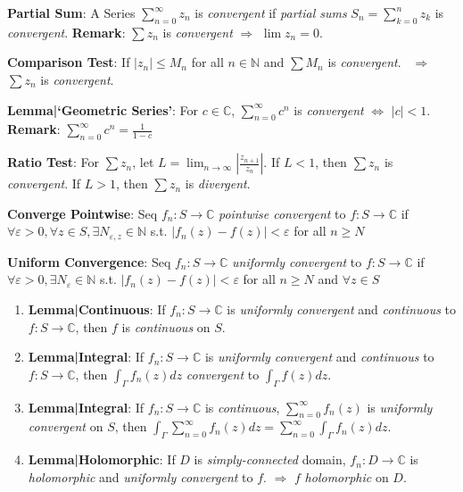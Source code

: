 \documentclass[9pt]{article}
\begin{document}
\textbf{Partial Sum}: A Series $\sum_{n=0}^{\infty}z_n$ is \textit{convergent} if \textit{partial sums} $S_n = \sum_{k=0}^{n}z_k$ is \textit{convergent}. \quad \textbf{Remark}: $\sum z_n$ is \textit{convergent} $\Rightarrow$ $\lim z_n=0$.

\textbf{Comparison Test}: If $|z_n|\leq M_n$ for all $n\in\mathbb{N}$ and $\sum M_n$ is \textit{convergent}. \ $\Rightarrow$ \ $\sum z_n$ is \textit{convergent}.

\textbf{Lemma|`Geometric Series'}: For $c\in\mathbb{C}$, $\sum_{n=0}^\infty c^n$ is \textit{convergent} $\Leftrightarrow$ $|c|<1$. \quad \textbf{Remark}: $\sum_{n=0}^\infty c^n=\frac{1}{1-c}$

\textbf{Ratio Test}: {\small For $\sum z_n$, let $L = \lim_{n\to\infty}\left|\frac{z_{n+1}}{z_n}\right|$. \quad If $L<1$, then $\sum z_n$ is \textit{convergent}. \quad If $L>1$, then $\sum z_n$ is \textit{divergent}.} 

\textbf{Converge Pointwise}: {\small Seq $f_n: S\to\mathbb{C}$ \textit{pointwise convergent} to $f:S\to\mathbb{C}$ if \quad $\forall \varepsilon>0, \forall z \in S, \exists N_{\varepsilon,z}\in\mathbb{N}$ s.t. $|f_n(z)-f(z)|<\varepsilon$ for all $n\geq N$}

\textbf{Uniform Convergence}: {\small Seq $f_n: S\to\mathbb{C}$ \textit{uniformly convergent} to $f:S\to\mathbb{C}$ if \quad $\forall \varepsilon>0, \exists N_{\varepsilon}\in\mathbb{N}$ s.t. $|f_n(z)-f(z)|<\varepsilon$ for all $n\geq N$ and $\forall z\in S$}

\begin{enumerate}[itemsep=-2pt, topsep=-2pt]
    \item \textbf{Lemma|Continuous}: If $f_n:S\to\mathbb{C}$ is \textit{uniformly convergent} and \textit{continuous} to $f:S\to\mathbb{C}$, then $f$ is \textit{continuous} on $S$.
    \item \textbf{Lemma|Integral}: If $f_n:S\to\mathbb{C}$ is \textit{uniformly convergent} and \textit{continuous} to $f:S\to\mathbb{C}$, then $\int_{\Gamma}f_n(z)dz$ \textit{convergent} to $\int_{\Gamma}f(z)dz$.
    \item \textbf{Lemma|Integral}: If $f_n:S\to\mathbb{C}$ is \textit{continuous}, $\sum^\infty_{n=0}f_n(z)$ is \textit{uniformly convergent} on $S$, then $\int_{\Gamma}\sum^\infty_{n=0}f_n(z)dz=\sum^\infty_{n=0}\int_{\Gamma}f_n(z)dz$.
    \item \textbf{Lemma|Holomorphic}: {\small If $D$ is \textit{simply-connected} domain, $f_n:D\to\mathbb{C}$ is \textit{holomorphic} and \textit{uniformly convergent} to $f$. $\Rightarrow$ $f$ \textit{holomorphic} on $D$.}
\end{enumerate}
\end{document}
